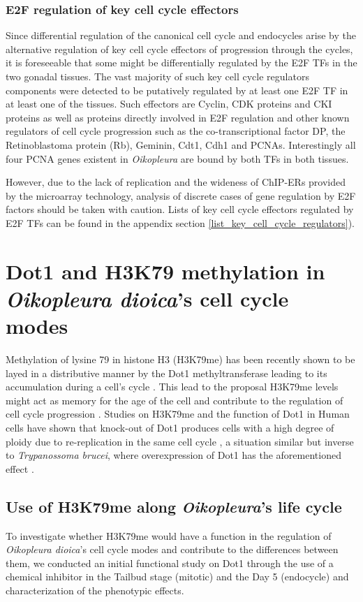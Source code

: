 \documentclass[11pt,twoside,a4paper]{report}
\begin{document}
		\subsubsection{E2F regulation of key cell cycle effectors}
		Since differential regulation of the canonical cell cycle and endocycles arise by the alternative regulation of key cell cycle effectors of progression through the cycles, it is foreseeable that some might be differentially regulated by the E2F TFs in the two gonadal tissues. The vast majority of such key cell cycle regulators components were detected to be putatively regulated by at least one E2F TF in at least one of the tissues. Such effectors are Cyclin, CDK proteins and CKI proteins as well as proteins directly involved in E2F regulation and other known regulators of cell cycle progression such as the co-transcriptional factor DP, the Retinoblastoma protein (Rb), Geminin, Cdt1, Cdh1 and PCNAs. Interestingly all four PCNA genes existent in \textit{Oikopleura} are bound by both TFs in both tissues.
		
		However, due to the lack of replication and the wideness of ChIP-ERs provided by the microarray technology, analysis of discrete cases of gene regulation by E2F factors should be taken with caution. Lists of key cell cycle effectors regulated by E2F TFs can be found in the appendix section \ref{list_key_cell_cycle_regulators}).
		
\clearpage
\section{Dot1 and H3K79 methylation in \textit{Oikopleura dioica}'s cell cycle modes}
	Methylation of lysine 79 in histone H3 (H3K79me) has been recently shown to be layed in a distributive manner by the Dot1 methyltransferase leading to its accumulation during a cell's cycle \cite{Frederiks2008}. This lead to the proposal H3K79me levels might act as memory for the age of the cell and contribute to the regulation of cell cycle progression \cite{DeVos2011}. Studies on H3K79me and the function of Dot1 in Human cells have shown that knock-out of Dot1 produces cells with a high degree of ploidy due to re-replication in the same cell cycle \cite{Fu2013a}, a situation similar but inverse to \textit{Trypanossoma brucei}, where overexpression of Dot1 has the aforementioned effect \cite{Gassen2012}.
	
	\subsection{Use of H3K79me along \textit{Oikopleura}'s life cycle}
	To investigate whether H3K79me would have a function in the regulation of \textit{Oikopleura dioica}'s cell cycle modes and contribute to the differences between them, we conducted an initial functional study on Dot1 through the use of a chemical inhibitor in the Tailbud stage (mitotic) and the Day 5 (endocycle) and characterization of the phenotypic effects.
	
\end{document}
